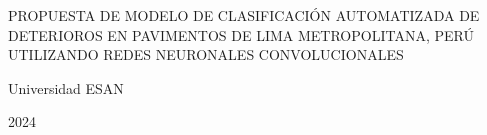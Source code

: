 \begin{center}
	{PROPUESTA DE MODELO DE CLASIFICACIÓN AUTOMATIZADA DE DETERIOROS EN PAVIMENTOS DE LIMA METROPOLITANA, PERÚ UTILIZANDO REDES NEURONALES CONVOLUCIONALES}
\end{center}

\vspace{3cm}

\rightline{\fillin[9cm]}
\vspace{3cm}

\rightline{\fillin[9cm]}
\vspace{3cm}

\rightline{\fillin[9cm]}
\vspace{3cm}

\centerline{Universidad ESAN}
\centerline{2024}